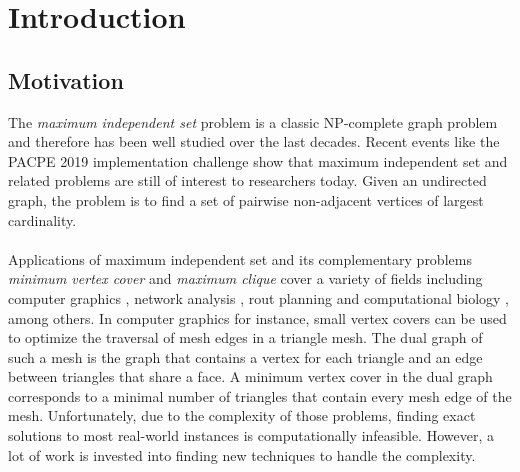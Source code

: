 \documentclass[]{article}
\title{}
\author{}
\begin{document}



\section{Introduction} \label{sec1}
\subsection{Motivation}
The \emph{maximum independent set} problem is a classic NP-complete graph problem \cite{GareyJohnson} and therefore has been well studied over the last decades. Recent events like the PACPE 2019 implementation challenge \cite{bibitem} show that maximum independent set and related problems are still of interest to researchers today. Given an undirected graph, the problem is to find a set of pairwise non-adjacent vertices of largest cardinality.\paragraph{}
Applications of maximum independent set and its complementary problems \emph{minimum vertex cover} and \emph{maximum clique} cover a variety of fields including computer graphics \cite{CG}, network analysis \cite{NW}, rout planning \cite{RP} and computational biology \cite{BIO1, BIO2}, among others. In computer graphics for instance, small vertex covers can be used to optimize the traversal of mesh edges in a triangle mesh. The dual graph of such a mesh is the graph that contains a vertex for each triangle and an edge between triangles that share a face. A minimum vertex cover in the dual graph corresponds to a minimal number of triangles that contain every mesh edge of the mesh. Unfortunately, due to the complexity of those problems, finding exact solutions to most real-world instances is computationally infeasible. However, a lot of work is invested into finding new techniques to handle the complexity. \paragraph{}
\end{document}

